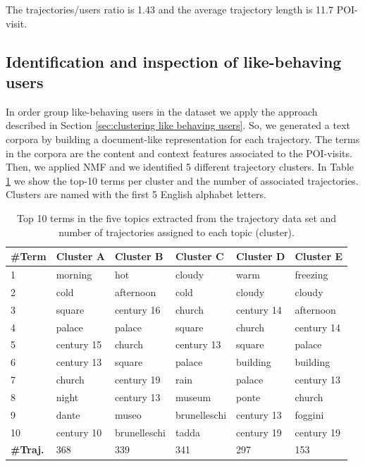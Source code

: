 The trajectories/users ratio is 1.43 and the average trajectory length is 11.7 POI-visit. 

\subsection{Identification and inspection of like-behaving users}
In order group like-behaving users in the dataset we apply the approach described in Section \ref{sec:clustering like behaving users}. So, we generated a text corpora by building a document-like representation for each trajectory. The terms in the corpora are the content and context features associated to the POI-visits. Then, we applied NMF and we identified 5 different trajectory clusters.
In Table \ref{tab:Topics} we show the top-10 terms per cluster and the number of associated trajectories. Clusters are named with the first 5 English alphabet letters.

\begin{table}[h]
	\centering
	
	\caption{Top 10 terms in the five topics extracted from the trajectory data set and number of trajectories assigned to each topic (cluster).}
	
	\label{tab:Topics}
	\begin{tabular}{ |l|l|l|l|l|l| }
		\hline
		\textbf{\#Term} & \textbf{Cluster A} & \textbf{Cluster B}  & \textbf{Cluster C}& \textbf{Cluster D} & \textbf{Cluster E}  \\ \hline
		1  & morning &hot &cloudy &warm &freezing   \\ \hline
		2  & cold &afternoon &cold &cloudy &cloudy   \\ \hline
		3  & square &century 16 &church &century 14 &afternoon   \\ \hline
		4  & palace &palace &square &church &century 14   \\ \hline
		5  & century 15 &church &century 13 &square &palace   \\ \hline
		6  & century 13 &square &palace &building &building   \\ \hline
		7  & church &century 19 &rain &palace &century 13   \\ \hline
		8  & night &century 13 &museum &ponte &church   \\ \hline
		9  & dante &museo &brunelleschi &century 13 &foggini   \\ \hline
		10 & century 10 &brunelleschi &tadda &century 19 &century 19   \\ \hline
		\hline
		\textbf{\#Traj.} & 368 & 339 & 341 & 297 & 153 \\ \hline
		
	\end{tabular}
\end{table}

